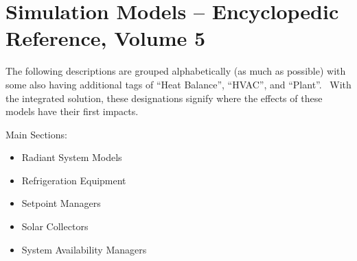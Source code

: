 \chapter{Simulation Models -- Encyclopedic Reference, Volume 5}\label{simulation-models-encyclopedic-reference-004}

The following descriptions are grouped alphabetically (as much as possible) with some also having additional tags of ``Heat Balance'', ``HVAC'', and ``Plant''.~ With the integrated solution, these designations signify where the effects of these models have their first impacts.

Main Sections:

\begin{itemize}
  \tightlist
  \item Radiant System Models
  \item Refrigeration Equipment
  \item Setpoint Managers
  \item Solar Collectors
  \item System Availability Managers
\end{itemize}
